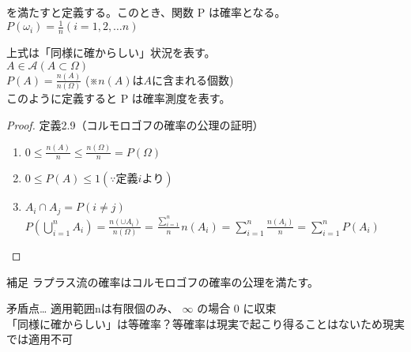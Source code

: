 \documentclass[dvipdfmx,10pt, a4j]{jarticle}
\theoremstyle{definition}
\begin{document}
    を満たすと定義する。このとき、関数 P は確率となる。\\

    $P({\omega_i}) = \frac{1}{n}(i = 1,2,\dots n)$

    上式は「同様に確からしい」状況を表す。\\

    $A \in \mathcal{A} (A \subset \Omega)$\\

    $P(A) = \frac{n(A)}{n(\Omega)}$ (※$ n(A) は A に含まれる個数$)\\

    このように定義すると P は確率測度を表す。\\

    \begin{proof} 定義2.9（コルモロゴフの確率の公理の証明）\\
    \begin{enumerate}
        \renewcommand{\labelenumi}{\roman{enumi})}
        \item
        $0 \leq \frac{n(A)}{n} \leq \frac{n(\Omega)}{n} = P(\Omega)$
        \item
        $0 \leq P(A) \leq 1   (\because 定義 i より)$
        \item
        ${A_i} \cap {A_j} = P(i \neq j)$\\
        $P\left(\bigcup_{i=1}^{n}{A_i}\right) = \frac{n(\cup {A_i})}{n(\Omega)} = \frac{\sum_{i=1}^n}{n} n({A_i}) = \sum_{i=1}^n \frac{n(A_i)}{n} = \sum_{i=1}^n P(A_i)$
    \end{enumerate}
    \end{proof}
    \begin{itembox}[l]{補足}
        ラプラス流の確率はコルモロゴフの確率の公理を満たす。
    \end{itembox}
    \begin{itembox}[l]{矛盾点\ldots}
        適用範囲nは有限個のみ、 $\infty$ の場合 0 に収束\\
        「同様に確からしい」は等確率？等確率は現実で起こり得ることはないため現実では適用不可
    \end{itembox}\\
\end{document}
